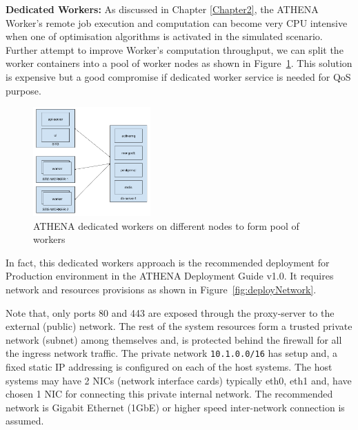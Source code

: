 \noindent \textbf{Dedicated Workers:} \quad As discussed in Chapter \ref{Chapter2}, the ATHENA Worker's remote job execution and computation can become very CPU intensive when one of optimisation algorithms is activated in the simulated scenario. Further attempt to improve Worker's computation throughput, we can split the worker containers into a pool of worker nodes as shown in Figure~\ref{fig:dedicatedWorkers}. This solution is expensive but a good compromise if dedicated worker service is needed for QoS purpose.

\begin{figure}[H]
\centering
\includegraphics[width=0.4\textwidth]{Figures/ATHENA_dedicated_workers}
\decoRule
\caption[ATHENA Dedicated Workers]{ATHENA dedicated workers on different nodes to form pool of workers}
\label{fig:dedicatedWorkers}
\end{figure}

In fact, this dedicated workers approach is the recommended deployment for Production environment in the ATHENA Deployment Guide v1.0\parencite{athenaAllDoc}. It requires network and resources provisions as shown in Figure~\ref{fig:deployNetwork}. 

Note that, only ports 80 and 443 are exposed through the proxy-server to the external (public) network. The rest of the system resources form a trusted private network (subnet) among themselves and, is protected behind the firewall for all the ingress network traffic. The private network \verb|10.1.0.0/16| has setup and, a fixed static IP addressing is configured on each of the host systems. The host systems may have 2 NICs (network interface cards) typically eth0, eth1 and, have chosen 1 NIC for connecting this private internal network. The recommended network is Gigabit Ethernet (1GbE) or higher speed inter-network connection is assumed.

